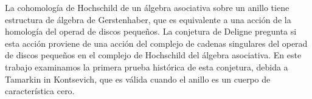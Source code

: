 \documentclass[TFM.tex]{subfiles}
\begin{document}

La cohomología de Hochschild de un álgebra asociativa sobre un anillo tiene estructura de álgebra de Gerstenhaber, que es equivalente a una acción de la homología del operad de discos pequeños. La conjetura de Deligne pregunta si esta acción proviene de una acción del complejo de cadenas singulares del operad de discos pequeños en el complejo de Hochschild del álgebra asociativa. En este trabajo examinamos la primera prueba histórica de esta conjetura, debida a Tamarkin in Kontsevich, que es válida cuando el anillo es un cuerpo de característica cero.
\end{document}
